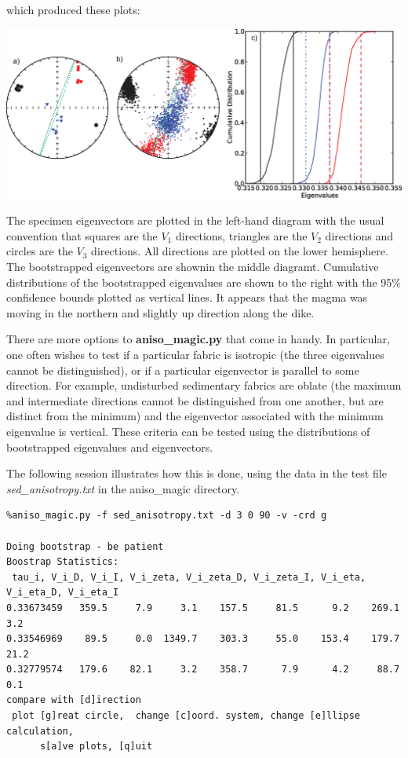 \documentclass[11pt]{book}
\begin{document}
{{{{\begin{verbatim}
\end{verbatim}

{\noindent which produced these plots:}


  \includegraphics[width=20 cm]{EPSfiles/dike.eps}

The specimen eigenvectors are plotted in the left-hand diagram with the usual convention that squares are the $V_1$ directions, triangles are the $V_2$ directions and circles are the $V_3$ directions.  All directions are plotted on the lower hemisphere.     The bootstrapped eigenvectors are shownin the middle diagramt.   Cumulative distributions of the bootstrapped eigenvalues are shown to the right with the 95\% confidence bounds plotted as vertical lines.  
It appears that the magma was moving in the northern and slightly up direction along the dike.  

There are more options to {\bf aniso\_magic.py} that come in handy.   In particular, one often wishes to test if a particular fabric is isotropic (the three eigenvalues cannot be distinguished), or if a particular eigenvector is parallel to some direction. For example, undisturbed sedimentary fabrics are oblate (the maximum and intermediate directions cannot be distinguished from one another, but are distinct from the minimum) and the eigenvector associated with the minimum eigenvalue is vertical. These criteria can be tested using the distributions of bootstrapped eigenvalues and eigenvectors.   

The following session illustrates how this is done, using the data in the test file {\it sed\_anisotropy.txt} in the aniso\_magic directory.

\begin{verbatim}
%aniso_magic.py -f sed_anisotropy.txt -d 3 0 90 -v -crd g

Doing bootstrap - be patient
Boostrap Statistics: 
 tau_i, V_i_D, V_i_I, V_i_zeta, V_i_zeta_D, V_i_zeta_I, V_i_eta, V_i_eta_D, V_i_eta_I
0.33673459   359.5     7.9     3.1    157.5     81.5      9.2    269.1      3.2 
0.33546969    89.5     0.0  1349.7    303.3     55.0    153.4    179.7     21.2 
0.32779574   179.6    82.1     3.2    358.7      7.9      4.2     88.7      0.1 
compare with [d]irection 
 plot [g]reat circle,  change [c]oord. system, change [e]llipse calculation,  
      s[a]ve plots, [q]uit 
 \end{verbatim}
 
}}}}
\end{document}
